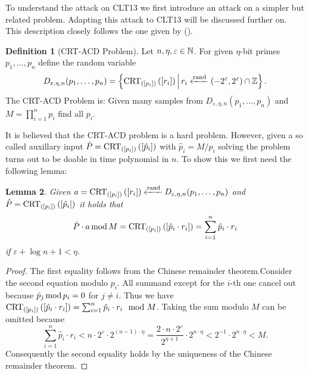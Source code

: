 \documentclass[english]{scrartcl}
\theoremstyle{plain}
\newtheorem{lemma}{Lemma}
\theoremstyle{definition}
\newtheorem{definition}[lemma]{Definition}
\begin{document}
    To understand the attack on CLT13 we first introduce an attack on a simpler but related problem. Adapting this attack to CLT13 will be discussed further on. This description closely follows the one given by \citeauthor*{cryptoeprint:2014:906} (\cite{cryptoeprint:2014:906}).

    \begin{definition}[CRT-ACD Problem]
        Let $n, \eta, \varepsilon \in \mathbb{N}$. For given $\eta$-bit primes $p_1, \dots, p_n$ define the random variable
        \begin{equation*}
            D_{\varepsilon, \eta, n}(p_1, \dots, p_n) = \left\lbrace \operatorname{CRT}_{([p_{i}])}\left(\left[r_i\right]\right) \,\middle|\, r_i \xleftarrow{\mathrm{rand}} (-2^\varepsilon, 2^\varepsilon) \cap \mathbb{Z} \right\rbrace.
        \end{equation*}
        The CRT-ACD Problem is: Given many samples from $D_{\varepsilon, \eta, n}(p_1, \dots, p_n)$ and $M = \prod_{i=1}^n p_i$ find all $p_i$.
    \end{definition}

    It is believed that the CRT-ACD problem is a hard problem. However, given a so called auxillary input $\hat{P} = \operatorname{CRT}_{([p_{i}])}\left(\left[\hat{p}_i\right]\right)$ with $\hat{p}_i = M / p_i$ solving the problem turns out to be doable in time polynomial in $n$.
    To show this we first need the following lemma:
    \begin{lemma}\label{lem:1}
        Given $a = \operatorname{CRT}_{([p_{i}])}\left(\left[r_i\right]\right) \xleftarrow{\mathrm{rand}} D_{\varepsilon, \eta, n}(p_1, \dots, p_n)$ and $\hat{P} = \operatorname{CRT}_{([p_{i}])}\left(\left[\hat{p}_i\right]\right)$ it holds that
        \begin{equation*}
            \hat{P} \cdot a \operatorname{mod} M = \operatorname{CRT}_{([p_{i}])}\left(\left[\hat{p}_i \cdot r_i\right]\right) = \sum_{i=1}^n \hat{p}_i \cdot r_i
        \end{equation*}
        if $\varepsilon + \log n + 1 < \eta$.
    \end{lemma}
    \begin{proof}
        The first equality follows from the Chinese remainder theorem.\@ Consider the second equation modulo $p_i$. All summand except for the $i$-th one cancel out because $\hat{p}_j \operatorname{mod} p_i = 0$ for $j \neq i$. Thus we have $\operatorname{CRT}_{([p_{i}])}\left(\left[\hat{p}_i \cdot r_i\right]\right) = \sum_{i=1}^n \hat{p}_i \cdot r_i \mod M$. Taking the sum modulo $M$ can be omitted because
        \begin{equation*}
            \sum_{i=1}^n \hat{p}_i \cdot r_i < n \cdot 2^\varepsilon \cdot 2^{(n-1)\cdot\eta}
            = \frac{2 \cdot n \cdot 2^\varepsilon}{2^{\eta + 1}} \cdot 2^{n \cdot \eta}
            < 2^{-1} \cdot 2^{n \cdot \eta} < M.
        \end{equation*} Consequently the second equality holds by the uniqueness of the Chinese remainder theorem.
    \end{proof}
\end{document}
